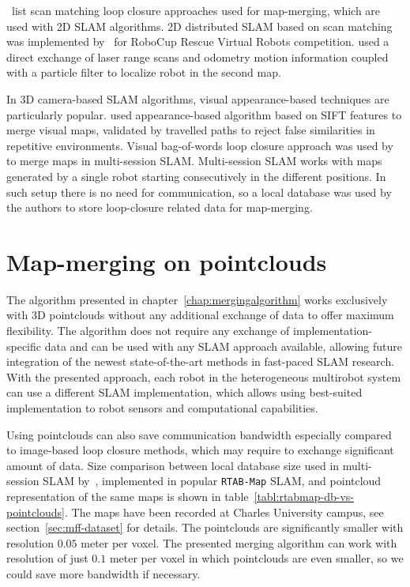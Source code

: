 \citet{lee2012survey}~list scan matching loop closure approaches used for map-merging, which are used with \gls{2D} \gls{SLAM} algorithms. \gls{2D} distributed \gls{SLAM} based on scan matching was implemented by~\citet{pfingsthorn2007scalable} for RoboCup Rescue Virtual Robots competition. \citet{fox2006distributed} used a direct exchange of laser range scans and odometry motion information coupled with a particle filter to localize robot in the second map.

In \gls{3D} camera-based \gls{SLAM} algorithms, visual appearance-based techniques are particularly popular. \citet{tomono2013merging} used appearance-based algorithm based on \gls{SIFT} features to merge visual maps, validated by travelled paths to reject false similarities in repetitive environments. Visual bag-of-words loop closure approach was used by~\citet{labbe2014online} to merge maps in multi-session \gls{SLAM}. Multi-session \gls{SLAM} works with maps generated by a single robot starting consecutively in the different positions. In such setup there is no need for communication, so a local database was used by the authors to store loop-closure related data for map-merging.

\section{Map-merging on pointclouds}
\label{sec:map-merging-on-pointclouds}

The algorithm presented in chapter~\ref{chap:mergingalgorithm} works exclusively with \gls{3D} pointclouds without any additional exchange of data to offer maximum flexibility. The algorithm does not require any exchange of implementation-specific data and can be used with any \gls{SLAM} approach available, allowing future integration of the newest state-of-the-art methods in fast-paced \gls{SLAM} research. With the presented approach, each robot in the heterogeneous multirobot system can use a different \gls{SLAM} implementation, which allows using best-suited implementation to robot sensors and computational capabilities.

Using pointclouds can also save communication bandwidth especially compared to image-based loop closure methods, which may require to exchange significant amount of data. Size comparison between local database size used in multi-session \gls{SLAM} by~\citet{labbe2014online}, implemented in popular \texttt{RTAB-Map} \gls{SLAM}, and pointcloud representation of the same maps is shown in table~\ref{tabl:rtabmap-db-vs-pointclouds}. The maps have been recorded at Charles University campus, see section~\ref{sec:mff-dataset} for details. The pointclouds are significantly smaller with resolution $0.05$ meter per voxel. The presented merging algorithm can work with resolution of just $0.1$ meter per voxel in which pointclouds are even smaller, so we could save more bandwidth if necessary.

